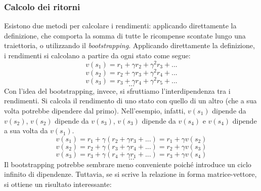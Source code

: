 \subsubsection{Calcolo dei ritorni}
Esistono due metodi per calcolare i rendimenti: applicando direttamente la definizione, che comporta la somma di tutte le ricompense scontate lungo una traiettoria, o utilizzando il \textit{bootstrapping}. Applicando direttamente la definizione, i rendimenti si calcolano a partire da ogni stato come segue:
\begin{equation}v(s_1)=r_1+\gamma r_2+\gamma^2 r_3+...\end{equation}
\begin{equation}v(s_2)=r_2+\gamma r_3+\gamma^2 r_4+...\end{equation}
\begin{equation}v(s_3)=r_3+\gamma r_4+\gamma^2 r_5+...\end{equation}
\[...\]
Con l'idea del bootstrapping, invece, si sfruttiamo l'interdipendenza tra i rendimenti. Si calcola il rendimento di uno stato con quello di un altro (che a sua volta potrebbe dipendere dal primo). Nell'esempio, infatti, $v(s_1)$ dipende da $v(s_2)$, $v(s_2)$ dipende da $v(s_3)$, $v(s_3)$ dipende da $v(s_4)$ e $v(s_4)$ dipende a sua volta da $v(s_1)$.
\begin{equation}v(s_1)=r_1+\gamma (r_2+\gamma r_3+...)= r_1+\gamma v(s_2)\end{equation}
\begin{equation}v(s_2)=r_2+\gamma (r_3+\gamma r_4+...)= r_2+\gamma v(s_3)\end{equation}
\begin{equation}v(s_3)=r_3+\gamma (r_4+\gamma r_1+...)= r_3+\gamma v(s_4)\end{equation}
\[...\]
Il bootstrapping potrebbe sembrare meno conveniente poiché introduce un ciclo infinito di dipendenze. Tuttavia, se si scrive la relazione in forma matrice-vettore, si ottiene un risultato interessante:
